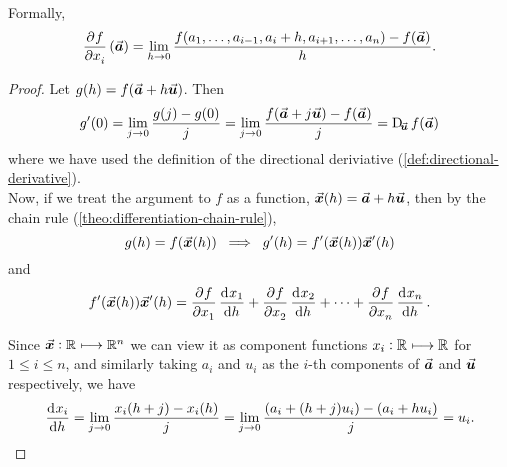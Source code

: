 \documentclass[../MathsNotesBase.tex]{subfiles}
\begin{document}
{{		Formally,
		\[ \dpd{f}{x_i}(\a) = \lim_{h \to 0} \frac{ f(a_1,\dots,a_{i-1},a_i + h,a_{i+1},\dots, a_n) - f(\a) }{ h }. \]
		}
	
		
	
		\biggerskip
		\begin{proof}\nl
			Let ${ g(h) = f(\vec{\bm{a}} + h\vec{\bm{u}}) }$. Then
			\[g'(0) = \lim_{j \to 0} \frac{ g(j) - g(0) }{ j } = \lim_{j \to 0} \frac{ f(\a + j\u) - f(\a) }{ j } = \Dif_{\u} f(\a) \]
			where we have used the definition of the directional deriviative (\ref{def:directional-derivative}).\\
			
			Now, if we treat the argument to $f$ as a function, ${ \vec{\bm{x}}(h) = \vec{\bm{a}} + h\vec{\bm{u}} }$, then by the chain rule (\autoref{theo:differentiation-chain-rule}),
			\[ g(h) = f(\vec{\bm{x}}(h)) \; \implies \; g'(h) = f'(\vec{\bm{x}}(h)) \vec{\bm{x}}'(h) \]
			and
			\[ f'(\x(h)) \x'(h) = \dpd{f}{x_1} \dod{x_1}{h} + \dpd{f}{x_2} \dod{x_2}{h} + \cdots + \dpd{f}{x_n} \dod{x_n}{h}. \]
			
			Since ${ \vec{\bm{x}} : \mathbb{R}^{} \longmapsto \mathbb{R}^{n} }$ we can view it as component functions ${ x_i: \mathbb{R}^{} \longmapsto \mathbb{R}^{} }$ for ${ 1 \leq i \leq n }$, and similarly taking $a_i$ and $u_i$ as the $i$-th components of $\vec{\bm{a}}$ and $\vec{\bm{u}}$ respectively, we have
			\[ \dod{x_i}{h} = \lim_{j \to 0} \frac{ x_i(h + j) - x_i(h) }{ j } = \lim_{j \to 0} \frac{ (a_i + (h + j) u_i) - (a_i + h u_i) }{ j } = u_i. \]
			

\end{proof}}
\end{document}
